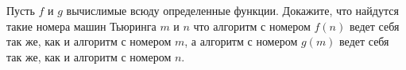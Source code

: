 Пусть $f$ и $g$  вычислимые всюду определенные функции. Докажите, что найдутся такие номера машин Тьюринга $m$ и  $n$ что
алгоритм с номером $f(n)$ ведет себя так же, как и алгоритм с номером $m$, а алгоритм с номером $g(m)$ ведет себя так же, как
и алгоритм с номером $n$.